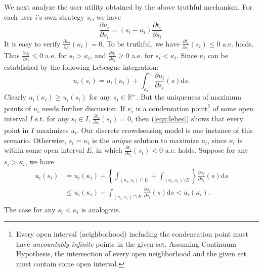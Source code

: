 \documentclass[conference]{IEEEtran}
\theoremstyle{definition}
\begin{document}
{We next analyze the user utility obtained by the above truthful mechanism. For each user $i$\rq{}s own strategy $s_i$, we have
\begin{equation}
\frac{\partial u_i}{\partial s_i}=(s_i-\kappa_i)\frac{\partial t_i}{\partial s_i}.
\end{equation}
It is easy to verify $\frac{\partial u_i}{\partial s_i}(\kappa_i)=0$. {\color{black}To be truthful, we have $\frac{\partial t_i}{\partial s_i}(s_i)\leq 0$ a.e. holds. Thus $\frac{\partial u_i}{\partial s_i}\leq 0$ a.e. for $s_i>\kappa_i$, and $\frac{\partial u_i}{\partial s_i}\geq 0$ a.e. for $s_i<\kappa_i$. Since $u_i$ can be established by the following Lebesgue integration:
\begin{equation}
\label{eqn:lebes}
u_i(s_i) = u_i(\kappa_i) + \int_{\kappa_i}^{s_i}\frac{\partial u_i}{\partial s_i}(s)\mathrm{d}s.
\end{equation} 
Clearly $u_i(\kappa_i)\geq u_i(s_i)$ for any $s_i\in \mathbb{R}^+$. But the uniqueness of maximum points of $u_i$ needs further discussion. 
If $\kappa_i$ is a condensation point\footnote{Every open interval (neighborhood) including the condensation point must have \emph{uncountably infinite} points in the given set. Assuming Continuum Hypothesis, the intersection of every open neighborhood and the given set must contain some open interval.} of some open interval $I$ s.t. for any $s_i\in I$, $\frac{\partial t_i}{\partial s_i}(s_i)=0$, then (\ref{eqn:lebes}) shows that every point in $I$ maximizes $u_i$. Our discrete crowdsensing model is one instance of this scenario. Otherwise, $s_i=\kappa_i$ is the \emph{unique} solution to maximize $u_i$, since $\kappa_i$ is within some open interval $E$, in which $\frac{\partial t_i}{\partial s_i}(s_i)<0$ a.e. holds. Suppose for any $s_i>\kappa_i$, we have
\begin{equation}
\begin{aligned}
u_i(s_i) &= u_i(\kappa_i) + \left\{\int_{(\kappa_i,s_i)\cap E} + \int_{(\kappa_i,s_i)\setminus E} \right\} \frac{\partial u_i}{\partial s_i}(s)\mathrm{d}s \\
&\leq u_i(\kappa_i) + \int_{(\kappa_i,s_i)\cap E}\frac{\partial u_i}{\partial s_i}(s)\mathrm{d}s < u_i(\kappa_i).\\
\end{aligned}
\end{equation}
The case for any $s_i<\kappa_i$ is analogous.
} 

}
\end{document}
